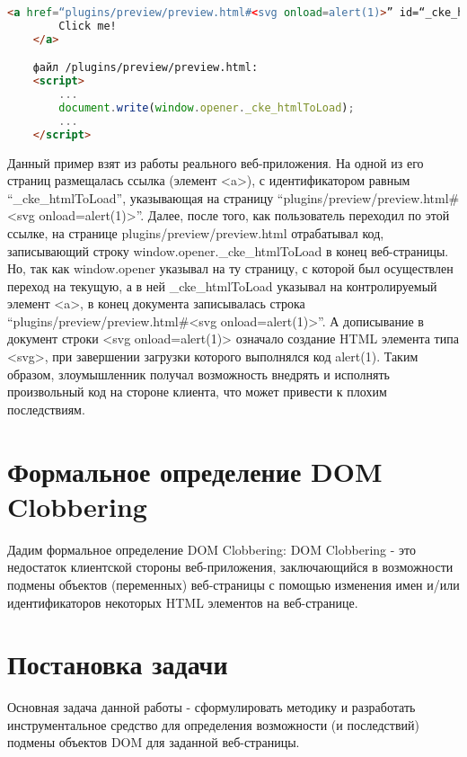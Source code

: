 \begin{lstlisting}[language=HTML]
	<a href=“plugins/preview/preview.html#<svg onload=alert(1)>” id=“_cke_htmlToLoad” target=“_blank”>
		Click me!
	</a>

	файл /plugins/preview/preview.html:
	<script>
		...
		document.write(window.opener._cke_htmlToLoad);
		...
	</script>
\end{lstlisting}
\bigskip


Данный пример взят из работы реального веб-приложения. На одной из его страниц размещалась ссылка (элемент <a>), с идентификатором равным \\
“\_cke\_htmlToLoad”, указывающая на страницу “plugins/preview/preview.html\#<svg onload=alert(1)>”. Далее, после того, как пользователь переходил по этой ссылке, на странице plugins/preview/preview.html отрабатывал код, записывающий строку window.opener.\_cke\_htmlToLoad в конец веб-страницы. Но, так как window.opener указывал на ту страницу, с которой был осуществлен переход на текущую, а в ней \_cke\_htmlToLoad указывал на контролируемый элемент <a>, в конец документа записывалась строка “plugins/preview/preview.html\#<svg onload=alert(1)>”. А дописывание в документ строки <svg onload=alert(1)> означало создание HTML элемента типа <svg>, при завершении загрузки которого выполнялся код alert(1).
Таким образом, злоумышленник получал возможность внедрять и исполнять произвольный код на стороне клиента, что может привести к плохим последствиям.

\section{Формальное определение DOM Clobbering}

Дадим формальное определение DOM Clobbering: DOM Clobbering - это недостаток клиентской стороны веб-приложения, заключающийся в возможности подмены объектов (переменных) веб-страницы с помощью изменения имен и/или идентификаторов некоторых HTML элементов на веб-странице.

\section{Постановка задачи}
Основная задача данной работы - сформулировать методику и разработать инструментальное средство для определения возможности (и последствий) подмены объектов DOM для заданной веб-страницы.